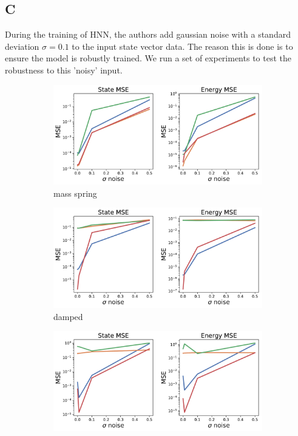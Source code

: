 \documentclass[twoside]{article}
\begin{document}
\subsection*{C}
During the training of HNN, the authors add gaussian noise with a standard deviation $\sigma=0.1$ to the input state vector data. The reason this is done is to ensure the model is robustly trained. We run a set of experiments to test the robustness to this 'noisy' input. 
\begin{figure}[h!]
\centering
\captionsetup{justification=centering}
\begin{subfigure}[b]{0.42\textwidth}
\includegraphics[width=\textwidth]{figures/figures/mass_spring/1/mass_spring_noise_scaling.pdf}
\caption{mass spring}
\end{subfigure}
\begin{subfigure}[b]{0.42\textwidth}
\includegraphics[width=\textwidth]{figures/figures/damped/1/damped_noise_scaling.pdf}
\caption{damped}
\end{subfigure}
\begin{subfigure}[b]{0.42\textwidth}
\includegraphics[width=\textwidth]{figures/figures/forced_mass_spring/1/forced_mass_spring_noise_scaling.pdf}

\end{subfigure}
\end{figure}
\end{document}
